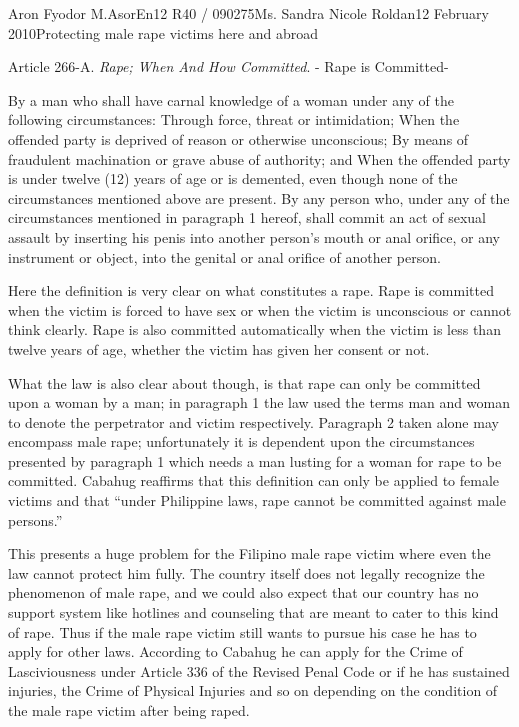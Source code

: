 \documentclass[12pt,letterpaper]{article}
\begin{document}
\begin{mla}{Aron Fyodor M.}{Asor}{En12 R40 / 090275}{Ms. Sandra Nicole Roldan}{12 February 2010}{Protecting male rape victims here and abroad}
\begin{mlaquote}
	Article 266-A. \textit{Rape; When And How Committed}. - Rape is Committed-
	\begin{outline}[enumerate]
			\1 By a man who shall have carnal knowledge of a woman under any of the following circumstances:
				\2 Through force, threat or intimidation;
				\2 When the offended party is deprived of reason or otherwise unconscious;
				\2 By means of fraudulent machination or grave abuse of authority; and
				\2 When the offended party is under twelve (12) years of age or is demented, even though none of the circumstances mentioned above are present.
			\1 By any person who, under any of the circumstances mentioned in paragraph 1 hereof, shall commit an act of sexual assault by inserting his penis into another person's mouth or anal orifice, or any instrument or object, into the genital or anal orifice of another person.
	\end{outline}
\end{mlaquote}

Here the definition is very clear on what constitutes a rape. Rape is committed when the victim is forced to have sex or when the victim is unconscious or cannot think clearly. Rape is also committed automatically when the victim is less than twelve years of age, whether the victim has given her consent or not.

What the law is also clear about though, is that rape can only be committed upon a woman by a man; in paragraph 1 the law used the terms man and woman to denote the perpetrator and victim respectively. Paragraph 2 taken alone may encompass male rape; unfortunately it is dependent upon the circumstances presented by paragraph 1 which needs a man lusting for a woman for rape to be committed. Cabahug reaffirms that this definition can only be applied to female victims and that ``under Philippine laws, rape cannot be committed against male persons.''

This presents a huge problem for the Filipino male rape victim where even the law cannot protect him fully. The country itself does not legally recognize the phenomenon of male rape, and we could also expect that our country has no support system like hotlines and counseling that are meant to cater to this kind of rape. Thus if the male rape victim still wants to pursue his case he has to apply for other laws. According to Cabahug he can apply for the Crime of Lasciviousness under Article 336 of the Revised Penal Code or if he has sustained injuries, the Crime of Physical Injuries and so on depending on the condition of the male rape victim after being raped.


\end{mla}
\end{document}
